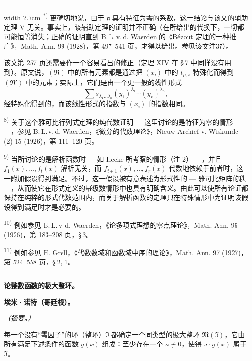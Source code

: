 \documentclass[11pt]{article}
\begin{document}
{\medskip
\hrule width 2.7cm
\smallskip
\noindent\textsuperscript{*)} 更确切地说，由于 $\mathfrak{a}$ 具有特征为零的系数，这一结论与该文的辅助定理 V 无关。事实上，该辅助定理的证明并不正确（在所给出的代换下，一切都可能恒等消失；正确的证明直到 B.\,L.\,v.\,d. Waerden 的《Bézout 定理的一种推广》，Math. Ann. 99 (1928)，第 497--541 页，才得以给出。参见该文注37）。

该文第 257 页还需要作一个容易看出的修正（定理 XIV 在 \S\,7 中同样没有用到）。原文说，$(\mathfrak{R})$ 中的所有元素都是通过把 $(x_i)$ 中的 $t_{\mu,\nu}$ 特殊化而得到 $(\mathfrak{R}')$ 中的元素；实际上，它们是由一个更一般的线性形式
\[
\sum s_{\lambda_1\ldots\lambda_n}(y_1)^{\lambda_1}\cdots(y_n)^{\lambda_n},
\]
经特殊化得到的，而该线性形式的指数与 $(x_i)$ 的指数相同。

\noindent\textsuperscript{8)} 关于这个雅可比行列式定理的纯代数证明 --- 这里讨论的是特征为零的情形 ---，参见 B.\,L.\,v.\,d. Waerden，《微分的代数理论》，Nieuw Archief v. Wiskunde (2) 15 (1926)，第 111--120 页。

\noindent\textsuperscript{9)} 当所讨论的是解析函数时 --- 如 Hecke 所考察的情形（注 2） ---，并且 $f_1(x),\ldots,f_t(x)$ 解析无关，而 $f_{t+1}(x),\ldots,f_r(x)$ 代数地依赖于前者时，这一附加假设得到满足。不过，这一假设被有意表述为形式性的 --- 雅可比矩阵的秩 ---，从而使它在形式定义的幂级数情形中也具有明确含义。由此可以使所有论证都保持在纯粹的形式代数范围内，而关于解析函数的定理只在特殊情形中为证明该假设得到满足时才是必要的。

\noindent\textsuperscript{10)} 例如参见 B.\,L.\,v.\,d. Waerden，《论多项式理想的零点理论》，Math. Ann. 96 (1926)，第 183--208 页，\S\,3。

\noindent\textsuperscript{11)} 例如参见 H. Grell，《代数数域和函数域中序的理论》，Math. Ann. 97 (1927)，第 524--558 页，\S\,2, 1。
}

\bigskip
\begin{center}\rule{4cm}{0.4pt}\end{center}
\begingroup
{}
\begin{center}
{\Large\bfseries 论整数函数的极大整环。}\par
\vspace{0.7em}
{\bfseries 埃米·诺特（哥廷根）。}\par
\vspace{0.5em}
\emph{（摘要。）}
\end{center}

每一个没有“零因子”的环（整环）$\mathfrak{I}$ 都确定一个同类型的极大整环 $\mathfrak{M}(\mathfrak{I})$，它由所有满足下述条件的函数 $g(x)$ 组成：至少存在一个 $a\ne0$，使得 $a\cdot g(x)$ 属于 $\mathfrak{I}$。
\end{document}
